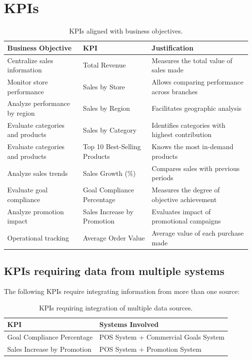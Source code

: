 \documentclass[12pt,a4paper]{article}
\begin{document}
\section{KPIs}

\begin{table}[H]
\centering
\small
\begin{tabular}{p{4.5cm} p{3.5cm} p{5.5cm}}
\toprule
\textbf{Business Objective} & \textbf{KPI} & \textbf{Justification}\\
\midrule
Centralize sales information & Total Revenue & Measures the total value of sales made\\
Monitor store performance & Sales by Store & Allows comparing performance across branches\\
Analyze performance by region & Sales by Region & Facilitates geographic analysis\\
Evaluate categories and products & Sales by Category & Identifies categories with highest contribution\\
Evaluate categories and products & Top 10 Best-Selling Products & Knows the most in-demand products\\
Analyze sales trends & Sales Growth (\%) & Compares sales with previous periods\\
Evaluate goal compliance & Goal Compliance Percentage & Measures the degree of objective achievement\\
Analyze promotion impact & Sales Increase by Promotion & Evaluates impact of promotional campaigns\\
Operational tracking & Average Order Value & Average value of each purchase made\\
\bottomrule
\end{tabular}
\caption{KPIs aligned with business objectives.}
\end{table}

\subsection{KPIs requiring data from multiple systems}

The following KPIs require integrating information from more than one source:

\begin{table}[H]
\centering
\begin{tabular}{p{4cm} p{9cm}}
\toprule
\textbf{KPI} & \textbf{Systems Involved}\\
\midrule
Goal Compliance Percentage & POS System + Commercial Goals System\\
Sales Increase by Promotion & POS System + Promotion System\\
\bottomrule
\end{tabular}
\caption{KPIs requiring integration of multiple data sources.}
\end{table}
\end{document}
